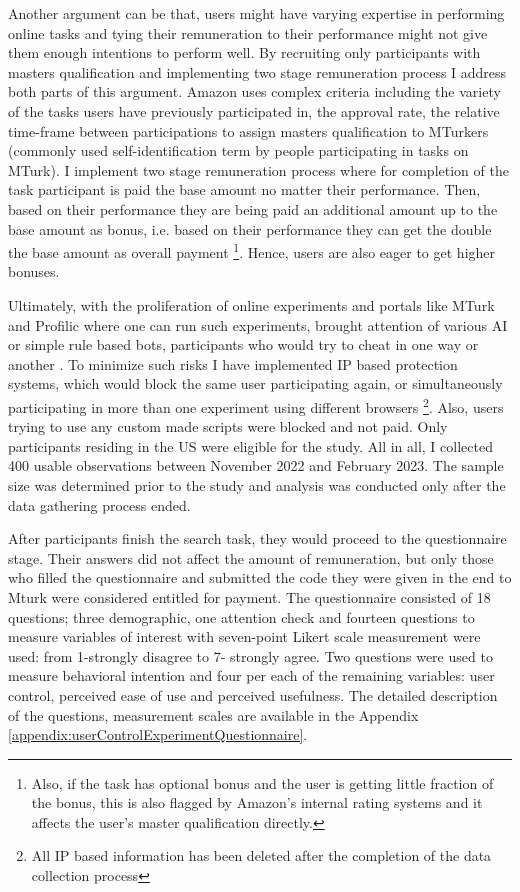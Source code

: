 \documentclass[a4paper,12pt]{article}
\begin{document}
Another argument can be that, users might have varying expertise in performing online tasks and tying their remuneration to their performance might not give them enough intentions to perform well. By recruiting only participants with masters qualification and implementing two stage remuneration process I address both parts of this argument.
Amazon uses complex criteria including the variety of the tasks users have previously participated in, the approval rate, the relative time-frame between participations to assign masters qualification to MTurkers (commonly used self-identification term by people participating in tasks on MTurk). I implement two stage remuneration process where for completion of the task participant is paid the base amount no matter their performance. Then, based on their performance they are being paid an additional amount up to the base amount as bonus, i.e. based on their performance they can get the double the base amount as overall payment \footnote{Also, if the task has optional bonus and the user is getting little fraction of the bonus, this is also flagged by Amazon's internal rating systems and it affects the user's master qualification directly.}. Hence, users are also eager to get higher bonuses.

Ultimately, with the proliferation of online experiments and portals like MTurk and Profilic where one can run such experiments, brought attention of various AI or simple rule based bots, participants who would try to cheat in one way or another \citep{aguinis2020mturk}. To minimize such risks I have implemented IP based protection systems, which would block the same user participating again, or simultaneously participating in more than one experiment using different browsers \footnote{All IP based information has been deleted after the completion of the data collection process}. Also, users trying to use any custom made scripts were blocked and not paid. Only participants residing in the US were eligible for the study. All in all, I collected 400 usable observations between November 2022 and February 2023. The sample size was determined prior to the study and analysis was conducted only after the data gathering process ended.

After participants finish the search task, they would proceed to the questionnaire stage. Their answers did not affect the amount of remuneration, but only those who filled the questionnaire and submitted the code they were given in the end to Mturk were considered entitled for payment.  The questionnaire consisted of 18 questions; three demographic, one attention check and fourteen questions to measure variables of interest with seven-point Likert scale measurement were used: from 1-strongly disagree to 7- strongly agree. Two questions were used to measure behavioral intention and four per each of the remaining variables: user control, perceived ease of use and perceived usefulness. The detailed description of the questions, measurement scales are available in the Appendix \ref{appendix:userControlExperimentQuestionnaire}. %
\end{document}
